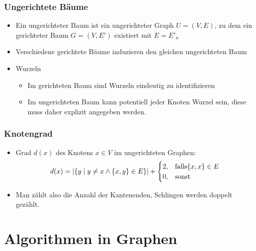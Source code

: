 \documentclass{article}
\newcommand{\important}[1]{\textcolor{importantColor}{#1}}
\newcommand{\set}[1]{\{#1\}}
\newcommand{\anfuehrung}[1]{\flqq #1\frqq}
\begin{document}
\subsubsection{Ungerichtete Bäume}
\begin{itemize}
    \item Ein \important{ungerichteter Baum} ist ein ungerichteter Graph $U=(V,E)$, zu dem ein gerichteter Baum $G=(V,E')$ existiert mit $E=E'_u$
    \item Verschiedene gerichtete Bäume induzieren den gleichen ungerichteten Baum
    \item Wurzeln
    \begin{itemize}
        \item Im gerichteten Baum sind Wurzeln eindeutig zu identifizieren
        \item Im ungerichteten Baum kann potentiell jeder Knoten Wurzel sein, diese muss daher explizit angegeben werden.
    \end{itemize}
\end{itemize}

\subsubsection{Knotengrad}
\begin{itemize}
    \item \important{Grad $d(x)$} des Knotens $x\in V$ im ungerichteten Graphen:
    \begin{align*}
        d(x)=|\set{y\mid y\not=x \land \set{x,y} \in E}| + \begin{cases}
        2, &$falls$ \set{x,x} \in E\\
        0, &$sonst$
        \end{cases}
    \end{align*}
    \item Man zählt also die Anzahl der \anfuehrung{Kantenenden}, Schlingen werden \important{doppelt} gezählt.
\end{itemize}

\newpage
\section{Algorithmen in Graphen}
\end{document}
